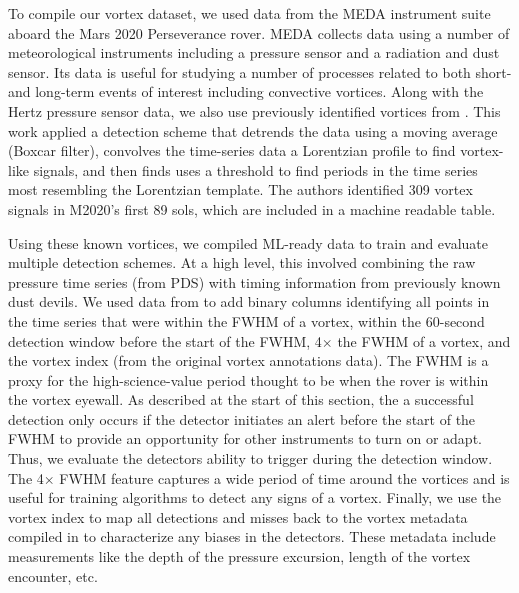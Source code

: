 To compile our vortex dataset, we used data from the \acrfull{MEDA} instrument suite aboard the Mars 2020 Perseverance rover. \acrshort{MEDA} collects data using a number of meteorological instruments including a pressure sensor and a radiation and dust sensor. Its data is useful for studying a number of processes related to both short- and long-term events of interest including convective vortices. Along with the \unit[1]{Hertz} pressure sensor data, we also use previously identified vortices from \cite{Jackson2022}. This work applied a detection scheme that detrends the data using a moving average (Boxcar filter), convolves the time-series data a Lorentzian profile to find vortex-like signals, and then finds uses a threshold to find periods in the time series most resembling the Lorentzian template. The authors identified 309 vortex signals in M2020's first 89 sols, which are included in a machine readable table.

Using these known vortices, we compiled \acrshort{ML}-ready data to train and evaluate multiple detection schemes. 
At a high level, this involved combining the raw pressure time series (from \acrshort{PDS}) with timing information from previously known dust devils. 
We used data from \cite{Jackson2022} to add binary columns identifying all points in the time series that were within the \acrfull{FWHM} of a vortex, within the 60-second detection window before the start of the \acrshort{FWHM}, 4$\times$ the \acrfull{FWHM} of a vortex, and the vortex index (from the original vortex annotations data). The \acrshort{FWHM} is a proxy for the high-science-value period thought to be when the rover is within the vortex eyewall. As described at the start of this section, the a successful detection only occurs if the detector initiates an alert before the start of the \acrshort{FWHM} to provide an opportunity for other instruments to turn on or adapt. Thus, we evaluate the detectors ability to trigger during the detection window. The 4$\times$ \acrfull{FWHM} feature captures a wide period of time around the vortices and is useful for training algorithms to detect any signs of a vortex. Finally, we use the vortex index to map all detections and misses back to the vortex metadata compiled in \cite{Jackson2022} to characterize any biases in the detectors. These metadata include measurements like the depth of the pressure excursion, length of the vortex encounter, etc.

